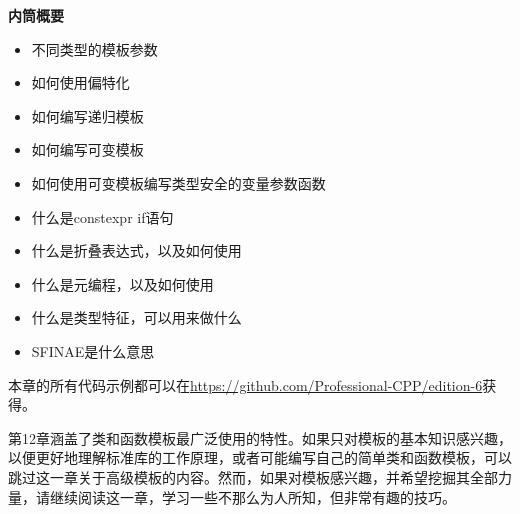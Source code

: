 \noindent
\textbf{内筒概要}

\begin{itemize}
\item
不同类型的模板参数

\item
如何使用偏特化

\item
如何编写递归模板

\item
如何编写可变模板

\item
如何使用可变模板编写类型安全的变量参数函数

\item
什么是constexpr if语句

\item
什么是折叠表达式，以及如何使用

\item
什么是元编程，以及如何使用

\item
什么是类型特征，可以用来做什么

\item
SFINAE是什么意思
\end{itemize}

本章的所有代码示例都可以在\url{https://github.com/Professional-CPP/edition-6}获得。

第12章涵盖了类和函数模板最广泛使用的特性。如果只对模板的基本知识感兴趣，以便更好地理解标准库的工作原理，或者可能编写自己的简单类和函数模板，可以跳过这一章关于高级模板的内容。然而，如果对模板感兴趣，并希望挖掘其全部力量，请继续阅读这一章，学习一些不那么为人所知，但非常有趣的技巧。



















